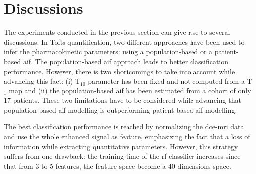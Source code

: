 \section{Discussions}\label{sec:discussions}

The experiments conducted in the previous section can give rise to several discussions.
In Tofts quantification, two different approaches have been used to infer the pharmacokinetic parameters: using a population-based or a patient-based \ac{aif}.
The population-based \ac{aif} approach leads to better classification performance.
However, there is two shortcomings to take into account while advancing this fact:
(i) T$_10$ parameter has been fixed and not computed from a T$_1$ map and
(ii) the population-based \ac{aif} has been estimated from a cohort of only 17 patients.
These two limitations have to be considered while advancing that population-based \ac{aif} modelling is outperforming patient-based \ac{aif} modelling.

The best classification performance is reached by normalizing the \ac{dce}-\ac{mri} data and use the whole enhanced signal as feature, emphasizing the fact that a loss of information while extracting quantitative parameters.
However, this strategy suffers from one drawback: the training time of the \ac{rf} classifier increases since that from 3 to 5 features, the feature space become a 40 dimensions space.

